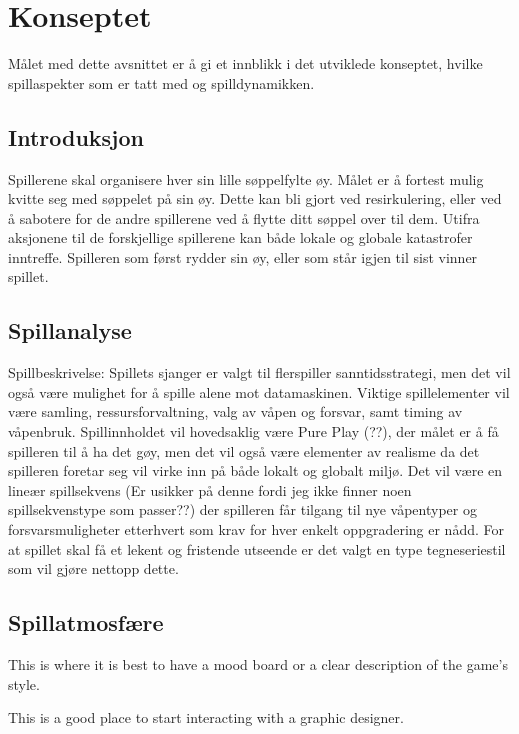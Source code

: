 \section{Konseptet}\label{sec:konsept}

Målet med dette avsnittet er å gi et innblikk i det utviklede konseptet,
hvilke spillaspekter som er tatt med og spilldynamikken.

\subsection{Introduksjon}

Spillerene skal organisere hver sin lille søppelfylte øy. Målet er å
fortest mulig kvitte seg med søppelet på sin øy. Dette kan bli gjort ved
resirkulering, eller ved å sabotere for de andre spillerene ved å flytte
ditt søppel over til dem. Utifra aksjonene til de forskjellige
spillerene kan både lokale og globale katastrofer inntreffe. Spilleren
som først rydder sin øy, eller som står igjen til sist vinner spillet.


\subsection{Spillanalyse}

Spillbeskrivelse: Spillets sjanger er valgt til flerspiller sanntidsstrategi, men det vil også være mulighet for å spille alene mot datamaskinen. Viktige spillelementer vil være samling, ressursforvaltning, valg av våpen og forsvar, samt timing av våpenbruk. Spillinnholdet vil hovedsaklig være Pure Play (??), der målet er å få spilleren til å ha det gøy, men det vil også være elementer av realisme da det spilleren foretar seg vil virke inn på både lokalt og globalt miljø. Det vil være en lineær spillsekvens (Er usikker på denne fordi jeg ikke finner noen  spillsekvenstype som passer??) der spilleren får tilgang til nye våpentyper og forsvarsmuligheter etterhvert som krav for hver enkelt oppgradering er nådd. For at spillet skal få et lekent og fristende utseende er det valgt en type tegneseriestil som vil gjøre nettopp dette. 

\subsection{Spillatmosfære}

This is where it is best to have a mood board or a clear description of the game’s style. 

This is a good place to start interacting with a graphic designer.\\


